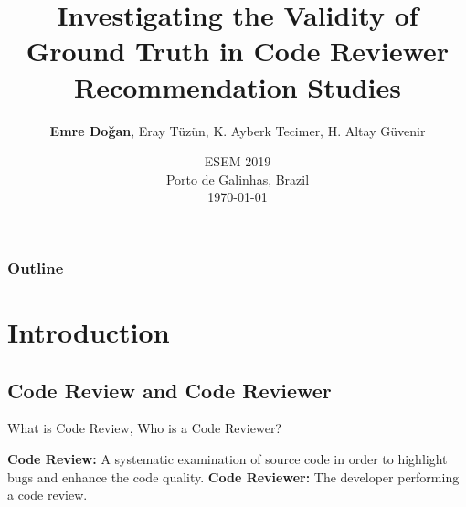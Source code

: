 \documentclass{beamer}
\title{Investigating the Validity of Ground Truth in Code Reviewer Recommendation Studies}
\author[]{\textbf{Emre Doğan}, Eray Tüzün, K. Ayberk Tecimer, H. Altay Güvenir}
\institute{MSc Student \newline Computer Engineering Department \newline Bilkent University}
\date
    {ESEM 2019\\
    Porto de Galinhas, Brazil \\
    \today}
\begin{document}
\begin{frame}
  \titlepage
\end{frame}

\begin{frame}
  \frametitle{Outline}

  \small \tableofcontents
\end{frame}


\section{Introduction}

\subsection{Code Review and Code Reviewer}

\begin{frame}{\large What is Code Review, Who is a Code Reviewer?}

  \textbf{Code Review:} A systematic examination of source code in order to highlight bugs and enhance the code quality.
  \pause
  \newline \newline
  \textbf{Code Reviewer:} The developer performing a code review.
  \pause
  \newline
    
  
\end{frame}
\end{document}
